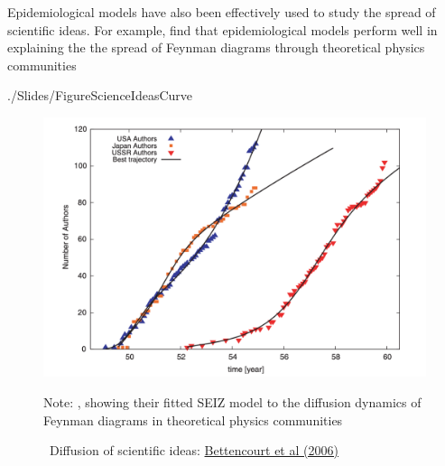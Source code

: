 Epidemiological models have also been effectively used to study the spread of scientific ideas.    For example,  \href{https://github.com/iworld1991/EpiExp/blob/master/Literature/bettencourt2006power.pdf}{\cite{bettencourt2006power}} find that epidemiological models perform well in explaining the the spread of Feynman diagrams through theoretical physics communities%

\begin{verbatimwrite}{./Slides/FigureScienceIdeasCurve}
  \begin{figure}[!ht] \centering
    \caption{ ~Diffusion of scientific ideas: \href{http://web.mit.edu/dikaiser/www/BAKC.PhysA.pdf}{Bettencourt et al (2006)}}\nocite{bettencourt2006power}
    \label{fig:science_ideas_curve}
    \centerline{\includegraphics[width=\textwidth]{./figures/Feynman}}
    \begin{flushleft}{\footnotesize Note: \cite{bettencourt2006power}, showing their fitted SEIZ model to the diffusion dynamics of Feynman diagrams in theoretical physics communities}
    \end{flushleft}
  \end{figure}
\end{verbatimwrite}

